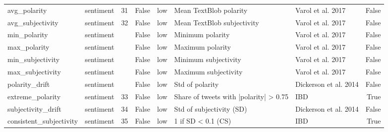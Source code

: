 \begin{tabular}{lllrlllr}
avg_polarity & sentiment & 31 & False & low & Mean TextBlob polarity & Varol et al. 2017 & False \\
avg_subjectivity & sentiment & 32 & False & low & Mean TextBlob subjectivity & Varol et al. 2017 & False \\
min_polarity & sentiment &  & False & low & Minimum polarity & Varol et al. 2017 & False \\
max_polarity & sentiment &  & False & low & Maximum polarity & Varol et al. 2017 & False \\
min_subjectivity & sentiment &  & False & low & Minimum subjectivity & Varol et al. 2017 & False \\
max_subjectivity & sentiment &  & False & low & Maximum subjectivity & Varol et al. 2017 & False \\
polarity_drift & sentiment &  & False & low & Std of polarity & Dickerson et al. 2014 & False \\
extreme_polarity & sentiment & 33 & False & low & Share of tweets with |polarity| > 0.75 & IBD & True \\
subjectivity_drift & sentiment & 34 & False & low & Std of subjectivity (SD) & Dickerson et al. 2014 & False \\
consistent_subjectivity & sentiment & 35 & False & low & 1 if SD < 0.1 (CS) & IBD & True \\
\bottomrule
\end{tabular}

